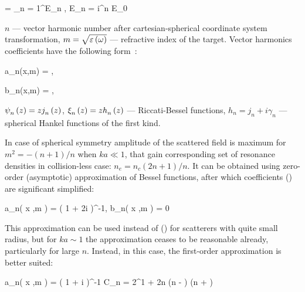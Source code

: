     \eq
		 = \sum_{n = 1}^{\infty}E_n , \qquad E_n = i^{n} E_0 
        \label{E_s_sph}
	\qe

$n$ --- vector harmonic number after cartesian-spherical coordinate system transformation, $m = \sqrt{\varepsilon\left(\omega\right)}$ --- refractive index of the target. Vector harmonics coefficients have the following form~\cite{boren_huffman}:


    \eq
		a_n(x,\:m) = ,
		\label{an_bessel}
	\qe

    \eq
        b_n(x,\:m) = ,
        \label{bn_bessel}
    \qe
    \eqc %
    \cqe %

\noindent ${\psi}_{n}^{} \left({z} \right) = z {j}_{n}^{} \left({z} \right)$, ${\xi}_{n}^{} \left({z} \right) = z {h}_{n}^{} \left({z} \right)$ --- Riccati-Bessel functions, $h_n = j_n + i \gamma_n$ --- spherical Hankel functions of the first kind. 

In case of spherical symmetry amplitude of the scattered field is maximum for $m^2 = - (n+ 1) / n$ when $ka \ll 1$, that gain corresponding set of resonance densities in collision-less case: $n_e = n_c(2n + 1) / n$. It can be obtained using zero-order (asymptotic) approximation of Bessel functions, after which coefficients () are significant simplified:

    \eq
        a_n\left( x ,\:m \right) = \left( 1 + 2i    \right)^{-1}, \qquad b_n\left( x ,\:m \right) = 0
        \label{ab_asymp}
    \qe

This approximation can be used instead of () for scatterers with quite small radius, but for $ka \sim 1$ the approximation ceases to be reasonable already, particularly for large $n$. Instead, in this case, the first-order approximation is better suited:

    \eq
		a_n\left( x ,\:m \right) = \left( 1 + i  \right)^{-1}
		\label{an_sph_asymp1}
	\qe
	\eqc
		C_n = 2^{1 + 2n} \Gamma(n - ) \Gamma(n + )
	\cqe


